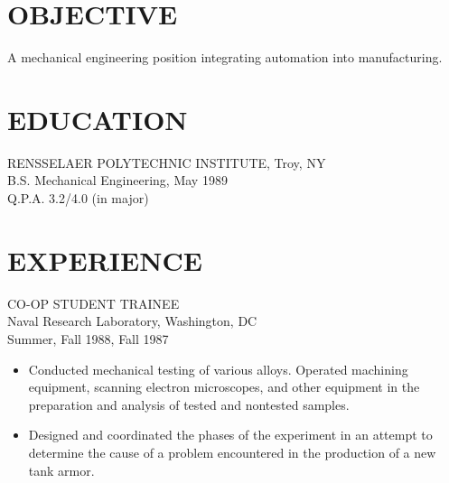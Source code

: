 \documentclass[11pt]{res} %
\begin{document}
 
 

\address{{\bf PRESENT ADDRESS} \\   176 Seventh Avenue \\   Troy, NY
         12180   \\ (518) 274-8671}
\address{{\bf PERMANENT ADDRESS} \\ 9280 Fox Harrow Lane \\ Annandale,
         VA 22003 \\ (703) 425-2734}
 
                                             
\begin{resume}
                                               
 
\section{OBJECTIVE}
   A mechanical engineering  position  integrating  automation  into 
manufacturing. 
 
\section{EDUCATION} 
 \noindent RENSSELAER POLYTECHNIC INSTITUTE, Troy, NY \\
B.S. Mechanical Engineering, May 1989 \\
Q.P.A. 3.2/4.0 (in major) 
 
\section{EXPERIENCE} 
 CO-OP STUDENT TRAINEE \\
Naval Research Laboratory, Washington, DC \\
Summer, Fall 1988, Fall 1987 
\vspace{0.2in}
   \begin{itemize} \itemsep -2pt  %
   \item Conducted  mechanical  testing  of  various  alloys. Operated 
    machining equipment, scanning electron microscopes, and other 
    equipment  in  the  preparation  and  analysis  of tested and 
    nontested samples. 
   \item Designed and coordinated the phases of the experiment  in  an 
    attempt  to  determine  the cause of a problem encountered in 
    the production of a new tank armor. 
 \end{itemize}


\end{resume}
\end{document}
